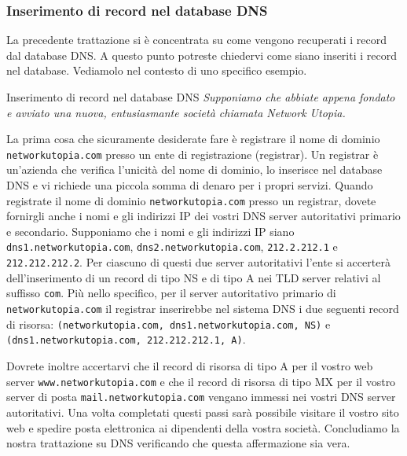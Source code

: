 \subsubsection{Inserimento di record nel database DNS}
La precedente trattazione si è concentrata su come vengono recuperati i record dal database DNS. A questo punto potreste chiedervi come siano inseriti i record nel database. Vediamolo nel contesto di uno specifico esempio. 

\begin{Example}{Inserimento di record nel database DNS}{}
    \textit{Supponiamo che abbiate appena fondato e avviato una nuova, entusiasmante società chiamata Network Utopia.} 
    
    La prima cosa che sicuramente desiderate fare è registrare il nome di dominio \texttt{networkutopia.com} presso un ente di registrazione (registrar). Un registrar è un'azienda che verifica l'unicità del nome di dominio, lo inserisce nel database DNS e vi richiede una piccola somma di denaro per i propri servizi. Quando registrate il nome di dominio \texttt{networkutopia.com} presso un registrar, dovete fornirgli anche i nomi e gli indirizzi IP dei vostri DNS server autoritativi primario e secondario. Supponiamo che i nomi e gli indirizzi IP siano \texttt{dns1.networkutopia.com}, \texttt{dns2.networkutopia.com}, \texttt{212.2.212.1} e \texttt{212.212.212.2}. Per ciascuno di questi due server autoritativi l'ente si accerterà dell'inserimento di un record di tipo NS e di tipo A nei TLD server relativi al suffisso \verb|com|.  Più nello specifico, per il server autoritativo primario di \texttt{networkutopia.com} il registrar inserirebbe nel sistema DNS i due seguenti record di risorsa: \texttt{(networkutopia.com, dns1.networkutopia.com, NS)} e \texttt{(dns1.networkutopia.com, 212.212.212.1, A)}.

    Dovrete inoltre accertarvi che il record di risorsa di tipo A per il vostro web server \texttt{www.networkutopia.com} e che il record di risorsa di tipo MX per il vostro server di posta \texttt{mail.networkutopia.com} vengano immessi nei vostri DNS server autoritativi. Una volta completati questi passi sarà possibile visitare il vostro sito web e spedire posta elettronica ai dipendenti della vostra società. Concludiamo la nostra trattazione su DNS verificando che questa affermazione sia vera. 


\end{Example}
